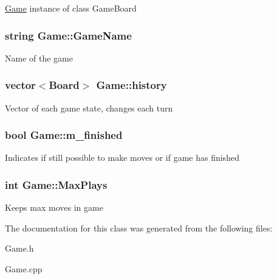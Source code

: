 \hyperlink{class_game}{Game} instance of class Game\-Board \hypertarget{class_game_a1b56d5db37d900da0911378cc01f4cad}{
\subsubsection[{Game\-Name}]{\setlength{\rightskip}{0pt plus 5cm}string Game\-::\-Game\-Name\hspace{0.3cm}{\ttfamily [protected]}}}\label{class_game_a1b56d5db37d900da0911378cc01f4cad}
Name of the game \hypertarget{class_game_a7c0dd74fa2e5c366638596b7e82428f1}{
\subsubsection[{history}]{\setlength{\rightskip}{0pt plus 5cm}vector$<${\bf Board}$>$ Game\-::history\hspace{0.3cm}{\ttfamily [protected]}}}\label{class_game_a7c0dd74fa2e5c366638596b7e82428f1}
Vector of each game state, changes each turn \hypertarget{class_game_aee0b70deb19422d35b2061beb339bdf8}{
\subsubsection[{m\-\_\-finished}]{\setlength{\rightskip}{0pt plus 5cm}bool Game\-::m\-\_\-finished}}\label{class_game_aee0b70deb19422d35b2061beb339bdf8}
Indicates if still possible to make moves or if game has finished \hypertarget{class_game_a53cb9be6604469db6b3abac24c5a2ab6}{
\subsubsection[{Max\-Plays}]{\setlength{\rightskip}{0pt plus 5cm}int Game\-::\-Max\-Plays\hspace{0.3cm}{\ttfamily [protected]}}}\label{class_game_a53cb9be6604469db6b3abac24c5a2ab6}
Keeps max moves in game 

The documentation for this class was generated from the following files\-:\begin{DoxyCompactItemize}
\item 
Game.\-h\item 
Game.\-cpp\end{DoxyCompactItemize}
